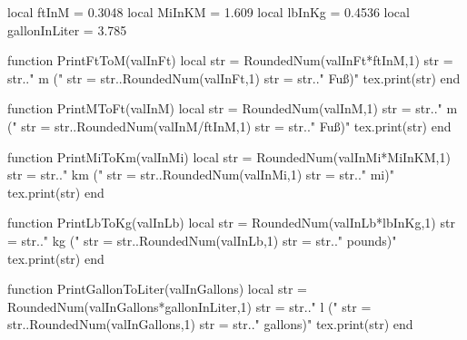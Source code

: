 \begin{luacode}
	local ftInM = 0.3048
	local MiInKM = 1.609
	local lbInKg = 0.4536
	local gallonInLiter = 3.785
	
	function PrintFtToM(valInFt)
		local str = RoundedNum(valInFt*ftInM,1)
		str = str.." m ("
		str = str..RoundedNum(valInFt,1)
		str = str.." Fuß)"
		tex.print(str)
	end
	
	function PrintMToFt(valInM)
		local str = RoundedNum(valInM,1)
		str = str.." m ("
		str = str..RoundedNum(valInM/ftInM,1)
		str = str.." Fuß)"
		tex.print(str)
	end

	function PrintMiToKm(valInMi)
		local str = RoundedNum(valInMi*MiInKM,1)
		str = str.." km ("
		str = str..RoundedNum(valInMi,1)
		str = str.." mi)"
		tex.print(str)
	end

	function PrintLbToKg(valInLb)
		local str = RoundedNum(valInLb*lbInKg,1)
		str = str.." kg ("
		str = str..RoundedNum(valInLb,1)
		str = str.." pounds)"
		tex.print(str)
	end

	function PrintGallonToLiter(valInGallons)
		local str = RoundedNum(valInGallons*gallonInLiter,1)
		str = str.." l ("
		str = str..RoundedNum(valInGallons,1)
		str = str.." gallons)"
		tex.print(str)
	end
\end{luacode}

\newcommand{\ft}[1]{
	\directlua{PrintFtToM(#1)}
}

\newcommand{\metre}[1]{
	\directlua{PrintMToFt(#1)}
}

\newcommand{\mile}[1]{
	\directlua{PrintMiToKm(#1)}
}

\newcommand{\lb}[1]{
	\directlua{PrintLbToKg(#1)}
}

\newcommand{\gallon}[1]{
	\directlua{PrintGallonToLiter(#1)}
}
